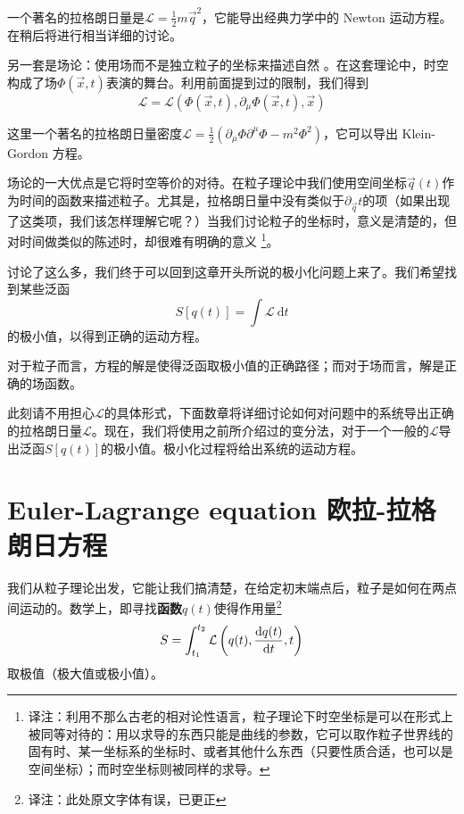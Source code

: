 一个著名的拉格朗日量是\({\mathcal L} = \frac{1}{2}m\vec{q}^2\)，它能导出经典力学中的 Newton 运动方程。在稍后将进行相当详细的讨论。

另一套是场论：使用场而不是独立粒子的坐标来描述自然%
%
。在这套理论中，时空构成了场\(\Phi(\vec{x},t)\)表演的舞台。利用前面提到过的限制，我们得到%
\begin{equation}
{\mathscr L} = {\mathscr L} (\Phi(\vec{x},t), \partial_\mu \Phi(\vec{x},t), \vec{x})
\end{equation}

这里一个著名的拉格朗日量密度\({\mathscr L} = \frac{1}{2}\left(\partial_\mu\Phi\partial^\mu\Phi-m^2\Phi^2\right)\)，它可以导出 Klein-Gordon 方程。

场论的一大优点是它将时空等价的对待。在粒子理论中我们使用空间坐标\(\vec{q}(t)\)作为时间的函数来描述粒子。尤其是，拉格朗日量中没有类似于\(\partial_{\vec{q}}t\)的项（如果出现了这类项，我们该怎样理解它呢？）当我们讨论粒子的坐标时，意义是清楚的，但对时间做类似的陈述时，却很难有明确的意义%
\footnote{译注：利用不那么古老的相对论性语言，粒子理论下时空坐标是可以在形式上被同等对待的：用以求导的东西只能是曲线的参数，它可以取作粒子世界线的固有时、某一坐标系的坐标时、或者其他什么东西（只要性质合适，也可以是空间坐标）；而时空坐标则被同样的求导。}。

讨论了这么多，我们终于可以回到这章开头所说的极小化问题上来了。我们希望找到某些泛函
\[
S[q(t)] = \int {\mathcal L}~{\mathrm d}t
\]
的极小值，以得到正确的运动方程。

对于粒子而言，方程的解是使得泛函取极小值的正确路径；而对于场而言，解是正确的场函数。

此刻请不用担心\(\mathcal L\)的具体形式，下面数章将详细讨论如何对问题中的系统导出正确的拉格朗日量\({\mathcal L}\)。现在，我们将使用之前所介绍过的变分法，对于一个一般的\(\mathcal L\)导出泛函\(S[q(t)]\)的极小值。极小化过程将给出系统的运动方程。

\section[欧拉-拉格朗日方程]{Euler-Lagrange equation \quad 欧拉-拉格朗日方程}\label{sec4.4}
我们从粒子理论出发，它能让我们搞清楚，在给定初末端点后，粒子是如何在两点间运动的。数学上，即寻找{\bf 函数}\(q(t)\)使得作用量\footnote{译注：此处原文字体有误，已更正}
\[
S = \int_{t_1}^{t_2} {\mathcal L}\left(q(t),\frac{\mathrm d q(t)}{\mathrm d t},t\right)
\]
取极值（极大值或极小值）。

